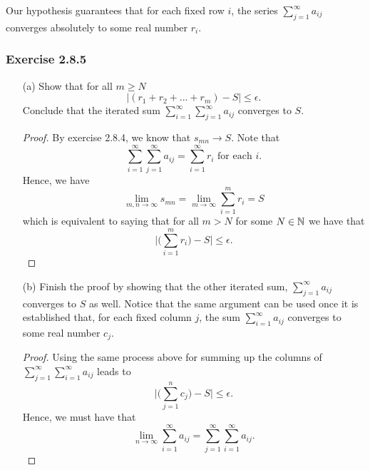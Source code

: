         Our hypothesis guarantees that for each fixed row \( i \), the series \( \sum_{ j=1 }^{ \infty  } a_{ij} \) converges absolutely to some real number \( r_i  \). 


        \subsubsection{Exercise 2.8.5}
        \begin{enumerate}
            \item[(a)] Show that for all \( m \geq N \) 
                \[ | (r_1 + r_2 + ... + r_m) - S  | \leq \epsilon. \]
                Conclude that the iterated sum \( \sum_{ i=1 }^{ \infty  } \sum_{ j=1 }^{ \infty  } a_{ij} \) converges to \( S \). 
                \begin{proof}
                    By exercise 2.8.4, we know that \( s_{mn} \to S  \). Note that 
                    \[  \sum_{ i=1 }^{ \infty   } \sum_{ j=1 }^{ \infty   } a_{ij} = \sum_{ i=1 }^{ \infty   } r_i \text{ for each } i.\]
                    Hence, we have 
                    \[ \lim_{ m,n \to \infty  } s_{mn} = \lim_{ m \to \infty  } \sum_{ i=1 }^{ m }r_i = S  \]
                    which is equivalent to saying that for all \( m > N  \) for some \( N \in \mathbb{N}  \) we have that 
                    \[  \Big| \Big( \sum_{ i=1 }^{ m } r_i \Big) - S \Big| \leq \epsilon.    \]
                \end{proof}
            \item[(b)] Finish the proof by showing that the other iterated sum, \( \sum_{ j=1 }^{ \infty  } a_{ij} \) converges to \( S \) as well. Notice that the same argument can be used once it is established that, for each fixed column \( j \), the sum \( \sum_{ i=1 }^{ \infty  } a_{ij} \) converges to some real number \( c_j \). 
                \begin{proof}
                    Using the same process above for summing up the columns of \( \sum_{ j=1 }^{ \infty  } \sum_{ i =1  }^{ \infty  } a_{ij} \) leads to 
                    \[ \Big| \Big( \sum_{ j=1 }^{ n  } c_j \Big) - S \Big| \leq  \epsilon.  \]
                    Hence, we must have that 
                    \[  \lim_{ n \to \infty  } \sum_{ i=1 }^{ \infty  } a_{ij} = \sum_{ j=1 }^{ \infty  } \sum_{ i =1 }^{ \infty  } a_{ij}. \]
                \end{proof}
        \end{enumerate}


